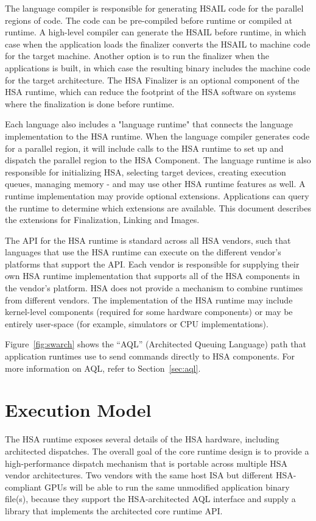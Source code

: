 \documentclass[final]{book}
\begin{document}
The language compiler is responsible for generating HSAIL code for the parallel
regions of code. The code can be pre-compiled before runtime or compiled at
runtime. A high-level compiler can generate the HSAIL before runtime, in which
case when the application loads the finalizer converts the HSAIL to machine
code for the target machine. Another option is to run the finalizer when
the applications is built, in which case the resulting binary includes the machine
code for the target architecture. The HSA Finalizer is an optional component of
the HSA runtime, which can reduce the footprint of the HSA software on systems
where the finalization is done before runtime.

Each language also includes a "language runtime" that connects the language
implementation to the HSA runtime. When the language compiler generates code for
a parallel region, it will include calls to the HSA runtime to set up and
dispatch the parallel region to the HSA Component. The language runtime is also
responsible for initializing HSA, selecting target devices, creating execution
queues, managing memory - and may use other HSA runtime features as well.
A runtime implementation may provide optional extensions. Applications can
query the runtime to determine which extensions are available. This document
describes the extensions for Finalization, Linking and Images.

The API for the HSA runtime is standard across all HSA vendors, such that
languages that use the HSA runtime can execute on the different vendor's
platforms that support the API. Each vendor is responsible for supplying their
own HSA runtime implementation that supports all of the HSA components in the
vendor's platform. HSA does not provide a mechanism to combine runtimes from
different vendors. The implementation of the HSA runtime may include
kernel-level components (required for some hardware components) or may be entirely
user-space (for example, simulators or CPU implementations).

Figure~\ref{fig:swarch} shows the ``AQL'' (Architected Queuing
Language) path that application runtimes use to send commands directly to
HSA components. For more information on AQL, refer to Section~\ref{sec:aql}.


\section{Execution Model}\label{executionmodel}

The HSA runtime exposes several details of the HSA hardware, including
architected dispatches. The overall goal of the core runtime design is to
provide a high-performance dispatch mechanism that is portable across multiple
HSA vendor architectures. Two vendors with the same host ISA but different
HSA-compliant GPUs will be able to run the same unmodified application binary
file(s), because they support the HSA-architected AQL interface and supply a
library that implements the architected core runtime API.
\end{document}
